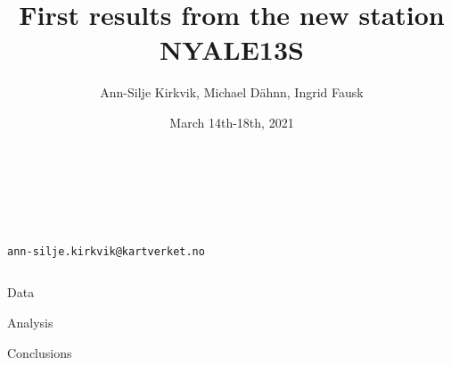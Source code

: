 \documentclass{beamer}
\title{First results from the new station NYALE13S}
\author{Ann-Silje Kirkvik, Michael D\"ahnn, Ingrid Fausk}
\institute{Norwegian Mapping Authority, Geodetic Institute}
\date{March 14th-18th, 2021}
\makeatletter
\newcommand{\contact}{ann-silje.kirkvik@kartverket.no}
\makeatother
\begin{document}
\begin{frame}[t]
  \color{white} 
  \vspace*{2cm}
  \begin{columns}
    \begin{column}[t]{.97\textwidth}
      {\bfseries\fontsize{88}{120}\selectfont \inserttitle}
    \end{column}
  \end{columns}

  \vspace*{2cm}
  \begin{columns}
    \begin{column}[t]{.25\textwidth}
      {\fontsize{30}{36}\selectfont\insertauthor\\[0.5cm]
        \fontsize{30}{36}\selectfont{\itshape\insertinstitute}\\
        \fontsize{24}{18}\selectfont\texttt{\contact}}
    \end{column}

    \begin{column}[t]{.7\textwidth}
      {\fontsize{30}{36}\selectfont\setlength{\parskip}{30pt}}
    \end{column}
  \end{columns}

  \begin{columns}

    \begin{column}[t]{.48\textwidth}
      \begin{block}{Data}
        \begin{multicols}{2}
          
        \end{multicols}
      \end{block}
      
      \begin{block}{Analysis}
          
      \end{block}
    
      \begin{block}{Conclusions}
        \begin{multicols}{2}
          
        \end{multicols}
      \end{block}
      
    \end{column}


\end{columns}
\end{frame}
\end{document}
